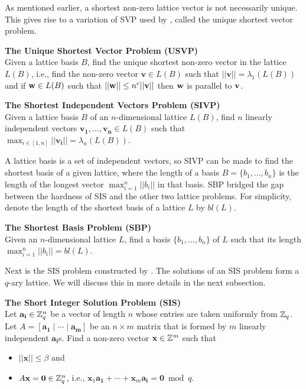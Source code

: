 \documentclass[../main.tex]{subfiles}
\begin{document}
As mentioned earlier, a shortest non-zero lattice vector is not necessarily unique. This gives rise to a variation of SVP used by \citet{ajtai1996generating}, called the unique shortest vector problem. 
\begin{tcolorbox}
\noindent
\textbf{The Unique Shortest Vector Problem (USVP)}\\
Given a lattice basis $B$, find the unique shortest non-zero vector in the lattice $L(B)$, i.e., find the non-zero vector $\mathbf{v} \in L(B)$ such that $||\mathbf{v}|| = \lambda_1(L(B))$ and if $\mathbf{w} \in L(B)$ such that $||\mathbf{w}|| \le n^c ||\mathbf{v}||$ then $\mathbf{w}$ is parallel to $\mathbf{v}$. 
\end{tcolorbox}

\begin{tcolorbox}
\noindent
\textbf{The Shortest Independent Vectors Problem (SIVP)}\\
Given a lattice basis $B$ of an $n$-dimensional lattice $L(B)$, find $n$ linearly independent vectors $\mathbf{v_1}, \dots, \mathbf{v_n} \in L(B)$ such that $\max_{i \in [1,n]} ||\mathbf{v_i}|| = \lambda_n(L(B))$.
\end{tcolorbox}

A lattice basis is a set of independent vectors, so SIVP can be made to find the shortest basis of a given lattice, where the length of a basis $B=\{b_1,\dots,b_n\}$ is the length of the longest vector $\max_{i=1}^n ||b_i||$ in that basis. SBP bridged the gap between the hardness of SIS and the other two lattice problems. For simplicity, denote the length of the shortest basis of a lattice $L$ by $bl(L)$.

\begin{tcolorbox}
\noindent
\textbf{The Shortest Basis Problem (SBP)}\\
Given an $n$-dimensional lattice $L$, find a basis $\{b_1, \dots, b_n\}$ of $L$ such that its length $\max_{i=1}^n ||b_i||=bl(L)$. 
\end{tcolorbox}

Next is the SIS problem constructed by \citet{ajtai1996generating}. The solutions of an SIS problem form a $q$-ary lattice. We will discuss this in more details in the next subsection. 
\begin{tcolorbox}
\noindent
\textbf{The Short Integer Solution Problem (SIS) }\\
Let $\mathbf{a_i} \in \mathbb{Z}_q^n$ be a vector of length $n$ whose entries are taken uniformly from $\mathbb{Z}_q$. Let $A = [\mathbf{a_1} \mid \cdots \mid \mathbf{a_m}]$ be an $n \times m$ matrix that is formed by $m$ linearly independent $\mathbf{a_i}$s. Find a non-zero vector $\mathbf{x} \in \mathbb{Z}^m$ such that
\begin{itemize}
    \item $||\mathbf{x}|| \le \beta$ and 
    \item $A \mathbf{x} = \mathbf{0} \in \mathbb{Z}_q^n$, i.e., $\mathbf{x}_1 \mathbf{a_1} + \cdots + \mathbf{x}_m \mathbf{a_i} = \mathbf{0} \bmod q$.
\end{itemize}
\end{tcolorbox}
\end{document}
